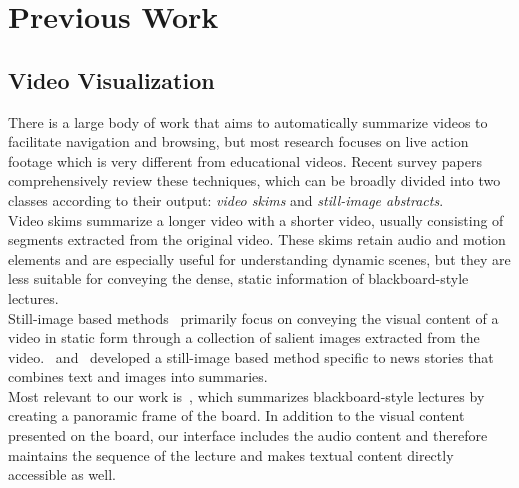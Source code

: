 \section{Previous Work}
%
\subsection{Video Visualization}
There is a large body of work that aims to automatically summarize videos to facilitate navigation and browsing, but most research focuses on live action footage which is very different from educational videos.  Recent survey papers \cite{truong2007video,borgo2011survey} comprehensively review these techniques, which can be broadly divided into two classes according to their output: \textit{video skims} and \textit{still-image abstracts}. \\
%
Video skims \cite{he1999auto,ekin2003automatic,ngo2005video,lu2013story} summarize a longer video with a shorter video, usually consisting of segments extracted from the original video. These skims retain audio and motion elements and are especially useful for understanding dynamic scenes, but they are less suitable for conveying the dense, static information of blackboard-style lectures. \\
%
Still-image based methods~\cite{uchihashi1999video,barnes2010video,hwang2006cinema,boreczky2000interactive}
primarily focus on conveying the visual content of a
video in static form through a collection of salient images extracted from the video.~\cite{christel2002collages} and~\cite{pickering2003anses} developed a still-image based method specific to news stories that combines text and images into summaries.\\
%
Most relevant to our work is~\cite{choudary2007summarization}, which summarizes blackboard-style lectures by creating a panoramic frame of the board. In addition to the visual content presented on the board, our interface includes the audio content and therefore maintains the sequence of the lecture and makes textual content directly accessible as well.\\

